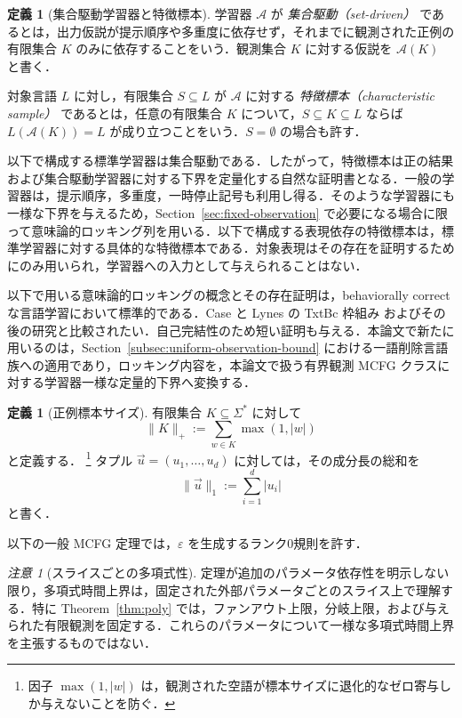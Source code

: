 \documentclass[11pt,a4paper]{ltjsarticle}
\numberwithin{equation}{section}
\theoremstyle{plain}
\theoremstyle{definition}
\newtheorem{definition}[theorem]{定義}
\theoremstyle{remark}
\newtheorem{remark}[theorem]{注意}
\newcommand{\tuple}[1]{\vec{#1}}
\newcommand{\eps}{\varepsilon}
\begin{document}
\begin{definition}[集合駆動学習器と特徴標本]
学習器 $\mathcal A$ が \emph{集合駆動（set-driven）} であるとは，出力仮説が提示順序や多重度に依存せず，それまでに観測された正例の有限集合 $K$ のみに依存することをいう．観測集合 $K$ に対する仮説を $\mathcal A(K)$ と書く．

対象言語 $L$ に対し，有限集合 $S\subseteq L$ が $\mathcal A$ に対する \emph{特徴標本（characteristic sample）} であるとは，任意の有限集合 $K$ について，$S\subseteq K\subseteq L$ ならば $L(\mathcal A(K))=L$ が成り立つことをいう．$S=\emptyset$ の場合も許す．

以下で構成する標準学習器は集合駆動である．したがって，特徴標本は正の結果および集合駆動学習器に対する下界を定量化する自然な証明書となる．一般の学習器は，提示順序，多重度，一時停止記号も利用し得る．そのような学習器にも一様な下界を与えるため，Section~\ref{sec:fixed-observation} で必要になる場合に限って意味論的ロッキング列を用いる．以下で構成する表現依存の特徴標本は，標準学習器に対する具体的な特徴標本である．対象表現はその存在を証明するためにのみ用いられ，学習器への入力として与えられることはない．
\end{definition}

以下で用いる意味論的ロッキングの概念とその存在証明は，behaviorally correct な言語学習において標準的である．Case と Lynes の TxtBc 枠組み
\cite{CaseLynes1982} およびその後の研究と比較されたい．自己完結性のため短い証明も与える．本論文で新たに用いるのは，Section~\ref{subsec:uniform-observation-bound} における一語削除言語族への適用であり，ロッキング内容を，本論文で扱う有界観測 MCFG クラスに対する学習器一様な定量的下界へ変換する．

\begin{definition}[正例標本サイズ]
有限集合 $K\subseteq\Sigma^*$ に対して
\[
\|K\|_+:=\sum_{w\in K}\max(1,|w|)
\]
と定義する．%
\footnote{因子 $\max(1,|w|)$ は，観測された空語が標本サイズに退化的なゼロ寄与しか与えないことを防ぐ．}
タプル $\tuple u=(u_1,\ldots,u_d)$ に対しては，その成分長の総和を
\[
\|\tuple u\|_1:=\sum_{i=1}^d|u_i|
\]
と書く．
\end{definition}

以下の一般 MCFG 定理では，$\eps$ を生成するランク0規則を許す．

\begin{remark}[スライスごとの多項式性]
\label{rem:slicewise-poly}
定理が追加のパラメータ依存性を明示しない限り，多項式時間上界は，固定された外部パラメータごとのスライス上で理解する．特に Theorem~\ref{thm:poly} では，ファンアウト上限，分岐上限，および与えられた有限観測を固定する．これらのパラメータについて一様な多項式時間上界を主張するものではない．
\end{remark}
\end{document}
